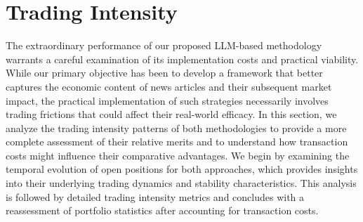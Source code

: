 \section{Trading Intensity}
The extraordinary performance of our proposed LLM-based methodology warrants a careful examination of its implementation costs and practical viability. While our primary objective has been to develop a framework that better captures the economic content of news articles and their subsequent market impact, the practical implementation of such strategies necessarily involves trading frictions that could affect their real-world efficacy. In this section, we analyze the trading intensity patterns of both methodologies to provide a more complete assessment of their relative merits and to understand how transaction costs might influence their comparative advantages.
We begin by examining the temporal evolution of open positions for both approaches, which provides insights into their underlying trading dynamics and stability characteristics. This analysis is followed by detailed trading intensity metrics and concludes with a reassessment of portfolio statistics after accounting for transaction costs.

%
%


